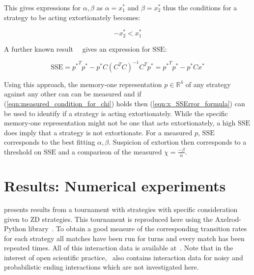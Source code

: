 \documentclass[a4paper]{article}
\newcommand{\SSe}{\text{SSE}}
\begin{document}
This gives expressions for \(\alpha, \beta\) as \(\alpha=x^*_1\) and
\(\beta=x^*_2\) thus the conditions for a strategy to be acting extortionately
becomes:

\begin{equation}
    -x^*_2 < x^*_1 \label{eqn:measured_condition_for_chi}
\end{equation}

A further known result~~\cite{kutner2004applied, rao1973linear,
wakefield2013bayesian} gives an expression for
\(\SSe\):

\begin{equation}\label{eqn:x_SSError_formula}
    \SSe = {p ^ *} ^ T p ^ * -
           p ^ * C \left(C ^ T C \right) ^ {-1} C ^ T p ^ *
         = {p ^ *} ^ T p ^ * - p ^ * C x ^ *
\end{equation}

Using this approach, the memory-one representation \(p\in\mathbb{R}^4\) of any
strategy against any other can can be measured and if
(\ref{eqn:measured_condition_for_chi}) holds then (\ref{eqn:x_SSError_formula})
can be used to identify if a strategy is acting extortionately. While the
specific memory-one representation might not be one that acts extortionately, a
high \(\SSe\) does imply that a strategy is not extortionate. For a measured
\(p\), \(\SSe\) corresponds to the best fitting \(\alpha, \beta\). Suspicion of
extortion then corresponds to a threshold on \(\SSe\) and a comparison of the
measured \(\chi=\frac{-\beta}{\alpha}\).

\section{Results: Numerical experiments}\label{sec:numerical-experiments}

\cite{Stewart2012} presents results from a tournament with
strategies
with specific consideration given to ZD strategies. This
tournament is reproduced here using the Axelrod-Python
library~\cite{Knight2016}. To obtain a good measure of the corresponding
transition rates for each strategy all matches have been run for
turns and every match has been
repeated times. All of this
interaction data is available at~\cite{vincent_knight_2018_1297075}. Note that
in the interest of open scientific practice,~\cite{vincent_knight_2018_1297075}
also contains interaction data for noisy and probabilistic ending interactions
which are not investigated here.
\end{document}
